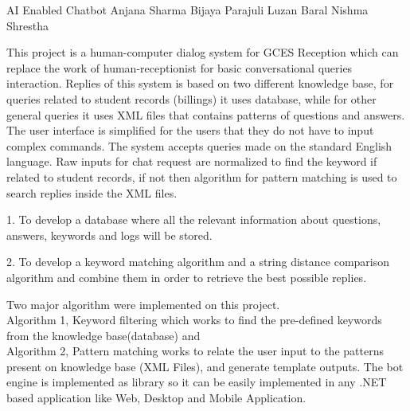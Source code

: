  \begin{conf-abstract}[]
 {AI Enabled Chatbot }
 {Anjana Sharma
 	Bijaya Parajuli
 	Luzan Baral
 	Nishma Shrestha
 }
{}

This project is a human-computer dialog system for GCES Reception which can replace the work of human-receptionist for basic conversational queries interaction. Replies of this system is based on two different knowledge base, for queries related to student records (billings) it uses database, while for other general queries it uses XML files that contains patterns of questions and answers. The user interface is simplified for the users that they do not have to input complex commands. The system accepts queries made on the standard English language. Raw inputs for chat request are normalized to find the keyword if related to student records, if not then algorithm for pattern matching is used to search replies inside the XML files.

1.	To develop a database where all the relevant information about questions, answers, keywords and logs will be stored.

2.	To develop a keyword matching algorithm and a string distance comparison algorithm and combine them in order to retrieve the best possible replies.

Two major algorithm were implemented on this project.
\\
 Algorithm 1, Keyword filtering which works to find the pre-defined keywords from the knowledge base(database) and 
 \\
 Algorithm 2, Pattern matching works to relate the user input to the patterns present on knowledge base (XML Files), and generate template outputs. The bot engine is implemented as library so it can be easily implemented in any .NET based application like Web, Desktop and Mobile Application.

 \end{conf-abstract}